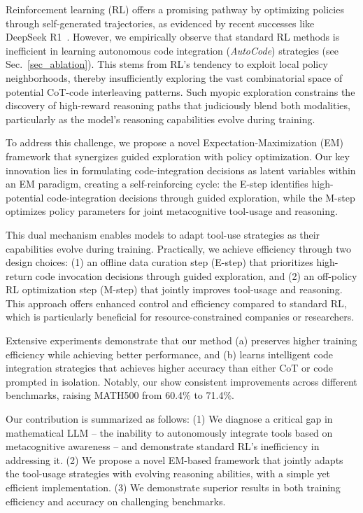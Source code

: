 Reinforcement learning (RL) offers a promising pathway by optimizing policies through self-generated trajectories, as evidenced by recent successes like DeepSeek R1~\citep{dsr1}. However, we empirically observe that standard RL methods is inefficient in learning autonomous code integration (\textit{AutoCode}) strategies (see Sec.~\ref{sec_ablation}). This stems from RL's tendency to exploit local policy neighborhoods, thereby insufficiently exploring the vast combinatorial space of potential CoT-code interleaving patterns. Such myopic exploration constrains the discovery of high-reward reasoning paths that judiciously blend both modalities, particularly as the model’s reasoning capabilities evolve during training.

To address this challenge, we propose a novel Expectation-Maximization (EM) framework that synergizes guided exploration with policy optimization. Our key innovation lies in formulating code-integration decisions as latent variables within an EM paradigm, creating a self-reinforcing cycle: the E-step identifies high-potential code-integration decisions through guided exploration, while the M-step optimizes policy parameters for joint metacognitive tool-usage and reasoning. 

This dual mechanism enables models to adapt tool-use strategies as their capabilities evolve during training. Practically, we achieve efficiency through two design choices: (1) an offline data curation step (E-step) that prioritizes high-return code invocation decisions through guided exploration, and (2) an off-policy RL optimization step (M-step) that jointly improves tool-usage and reasoning. This approach offers enhanced control and efficiency compared to standard RL, which is particularly beneficial for resource-constrained companies or researchers.

Extensive experiments demonstrate that our method (a) preserves higher training efficiency while achieving better performance, and (b) learns intelligent code integration strategies that achieves higher accuracy than either CoT or code prompted in isolation. Notably, our show consistent improvements across different benchmarks, raising MATH500 from 60.4\% to 71.4\%. 

Our contribution is summarized as follows:
(1) We diagnose a critical gap in mathematical LLM -- the inability to autonomously integrate tools based on metacognitive awareness -- and demonstrate standard RL’s inefficiency in addressing it.
(2) We propose a novel EM-based framework that jointly adapts the tool-usage strategies with evolving reasoning abilities, with a simple yet efficient implementation. 
(3) We demonstrate superior results in both training efficiency and accuracy on challenging benchmarks.

